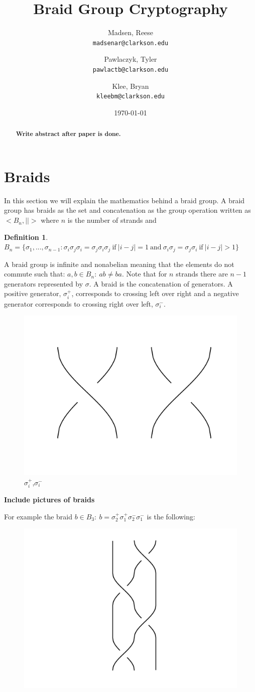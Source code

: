 \documentclass{article}
\title{Braid Group Cryptography}
\author{
  Madsen, Reese\\
  \texttt{madsenar@clarkson.edu}
  \and
  Pawlaczyk, Tyler\\
  \texttt{pawlactb@clarkson.edu}
   \and
  Klee, Bryan\\
  \texttt{kleebm@clarkson.edu}
}
\date{\today}
\theoremstyle{definition}
\newtheorem{definition}{Definition}[section]
\begin{document}
	\maketitle

	\begin{abstract}
	\textbf{Write abstract after paper is done.}
	\end{abstract}
	\newpage
	\section{Braids}
	In this section we will explain the mathematics behind a braid group. A braid group has braids as the set and concatenation as the group operation written as $<B_n,||>$ where $n$ is the number of strands and 

\begin{definition} 
$B_n=\{\sigma_1,...,\sigma_{n-1}:\sigma_i\sigma_j\sigma_i=\sigma_j\sigma_i\sigma_j\ \textrm{if}\ |i-j|=1\ \textrm{and}\ \sigma_i\sigma_j=\sigma_j\sigma_i\ \textrm{if}\ |i-j|>1\}$
\end{definition}
 
A braid group is infinite and nonabelian meaning that the elements do not commute such that:
$a,b \in B_n: \ ab\neq ba$. Note that for $n$ strands there are $n-1$ generators represented by $\sigma$. A braid is the concatenation of generators. A positive generator, $\sigma_i^+$, corresponds to crossing left over right and a negative generator corresponds to crossing right over left, $\sigma_i^-$. 

\begin{figure}[hbp!]
\centering
  \includegraphics[width=0.2\linewidth]{./Pictures/gen_pos_neg.png}
  \caption{$\sigma_i^+$,$\sigma_i^-$}\label{fig:graph}
\end{figure}

\textbf{Include pictures of braids}


For example the braid $b \in B_3: \ b=\sigma_2^+ \sigma_1^+ \sigma_2^- \sigma_1^-$ is the following:
	
	\begin{figure}[hbp!]
\centering
  \includegraphics[width=0.2\linewidth]{./Pictures/example_braid.png}
\end{figure}
	
\end{document}
